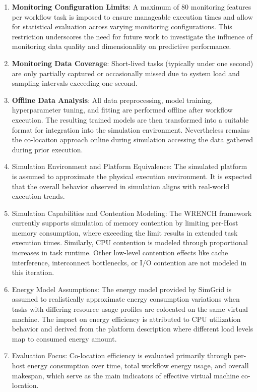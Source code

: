\begin{enumerate}
    \item \textbf{Monitoring Configuration Limits}: A maximum of 80 monitoring features per workflow task is imposed to ensure manageable execution times and allow for statistical evaluation across varying monitoring configurations. This restriction underscores the need for future work to investigate the influence of monitoring data quality and dimensionality on predictive performance.
    \item \textbf{Monitoring Data Coverage}: Short-lived tasks (typically under one second) are only partially captured or occasionally missed due to system load and sampling intervals exceeding one second.
    \item \textbf{Offline Data Analysis}: All data preprocessing, model training, hyperparameter tuning, and fitting are performed offline after workflow execution. The resulting trained models are then transformed into a suitable format for integration into the simulation environment. Nevertheless remains the co-locaiton approach online during simulation accessing the data gathered during prior execution.
    \item Simulation Environment and Platform Equivalence: The simulated platform is assumed to approximate the physical execution environment. It is expected that the overall behavior observed in simulation aligns with real-world execution trends.
    \item Simulation Capabilities and Contention Modeling: The WRENCH framework currently supports simulation of memory contention by limiting per-Host memory consumption, where exceeding the limit results in extended task execution times. Similarly, CPU contention is modeled through proportional increases in task runtime. Other low-level contention effects like cache interference, interconnect bottlenecks, or I/O contention are not modeled in this iteration.
    \item Energy Model Assumptions: The energy model provided by SimGrid is assumed to realistically approximate energy consumption variations when tasks with differing resource usage profiles are colocated on the same virtual machine. The impact on energy efficiency is attributed to CPU utilization behavior and derived from the platform description where different load levels map to consumed energy amount.
    \item Evaluation Focus: Co-location efficiency is evaluated primarily through per-host energy consumption over time, total workflow energy usage, and overall makespan, which serve as the main indicators of effective virtual machine co-location.
\end{enumerate}


